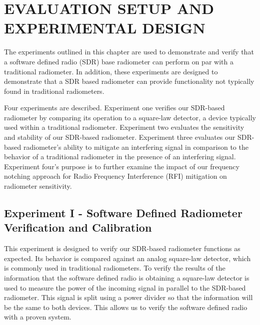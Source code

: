 

\chapter{EVALUATION SETUP AND EXPERIMENTAL DESIGN}\label{ch:exp_design}
The experiments outlined in this chapter are used to demonstrate and verify that a software defined radio (SDR) base radiometer can perform on par with a traditional radiometer.  In addition, these experiments are designed to demonstrate that a SDR based radiometer can provide functionality not typically found in traditional radiometers. 

Four experiments are described.  Experiment one verifies our SDR-based radiometer by comparing its operation to a square-law detector, a device typically used within a traditional radiometer.  Experiment two evaluates the sensitivity and stability of our SDR-based radiometer.  Experiment three evaluates our SDR-based radiometer's ability to mitigate an interfering signal in comparison to the behavior of a traditional radiometer in the presence of an interfering signal.  Experiment four's purpose is to further examine the impact of our frequency notching approach for Radio Frequency Interference (RFI) mitigation on radiometer sensitivity.

\section{Experiment I - Software Defined Radiometer Verification and Calibration}\label{Exp1}

This experiment is designed to verify our SDR-based radiometer functions as expected.  Its behavior is compared against an analog square-law detector, which is commonly used in traditional radiometers.  To verify the results of the information that the software defined radio is obtaining a square-law detector is used to measure the power of the incoming signal in parallel to the SDR-based radiometer.  This signal is split using a power divider so that the information will be the same to both devices.  This allows us to verify the software defined radio with a proven system.  

